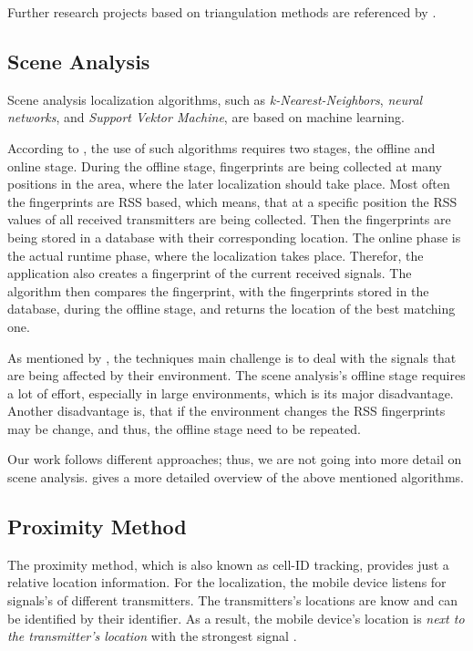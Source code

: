 Further research projects based on triangulation methods are referenced by \citet{IEEE:survey_wireless_indoor_pos}.

\subsection{Scene Analysis}
Scene analysis localization algorithms, such as \emph{k-Nearest-Neighbors}, \emph{neural networks}, and \emph{Support Vektor Machine}, are based on machine learning.

According to \citet{IEEE:survey_wireless_indoor_pos}, the use of such algorithms requires two stages, the offline and online stage. During the offline stage, fingerprints are being collected at many positions in the area, where the later localization should take place. Most often the fingerprints are \acs{RSS} based, which means, that at a specific position the \acs{RSS} values of all received transmitters are being collected. Then the fingerprints are being stored in a database with their corresponding location. The online phase is the actual runtime phase, where the localization takes place. Therefor, the application also creates a fingerprint of the current received signals. The algorithm then compares the fingerprint, with the fingerprints stored in the database, during the offline stage, and returns the location of the best matching one.

As mentioned by \citet{IEEE:survey_wireless_indoor_pos}, the techniques main challenge is to deal with the signals that are being affected by their environment. The scene analysis's offline stage requires a lot of effort, especially in large environments, which is its major disadvantage. Another disadvantage is, that if the environment changes the \acs{RSS} fingerprints may be change, and thus, the offline stage need to be repeated.

Our work follows different approaches; thus, we are not going into more detail on scene analysis. \citet{IEEE:survey_wireless_indoor_pos} gives a more detailed overview of the above mentioned algorithms.


\subsection{Proximity Method}
The proximity method, which is also known as cell-ID tracking, provides just a relative location information. For the localization, the mobile device listens for signals's of different transmitters. The transmitters's locations are know and can be identified by their identifier. As a result, the mobile device's location is \emph{next to the transmitter's location} with the strongest signal \citep{IEEE:survey_wireless_indoor_pos, wang:bt_pos}.


